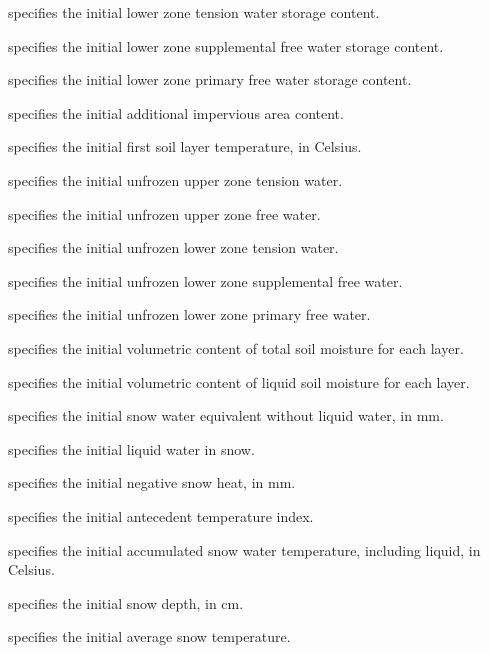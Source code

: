   specifies the initial
 lower zone tension water storage content.

  specifies the initial
 lower zone supplemental free water storage content.

  specifies the initial
 lower zone primary free water storage content.

  specifies the initial
 additional impervious area content.

  specifies the initial first soil
 layer temperature, in Celsius.

  specifies the initial
 unfrozen upper zone tension water.

  specifies the initial
 unfrozen upper zone free water.

  specifies the initial
 unfrozen lower zone tension water.

  specifies the initial
 unfrozen lower zone supplemental free water.

  specifies the initial
 unfrozen lower zone primary free water.

  specifies the initial volumetric
 content of total soil moisture for each layer.

  specifies the initial volumetric
 content of liquid soil moisture for each layer.

  specifies the initial snow water
 equivalent without liquid water, in mm.

  specifies the initial liquid water
 in snow.

  specifies the initial negative
 snow heat, in mm.

  specifies the initial antecedent
 temperature index.

  specifies the initial accumulated
 snow water temperature, including liquid, in Celsius.

  specifies the initial snow depth,
 in cm.

  specifies the initial average
 snow temperature.


